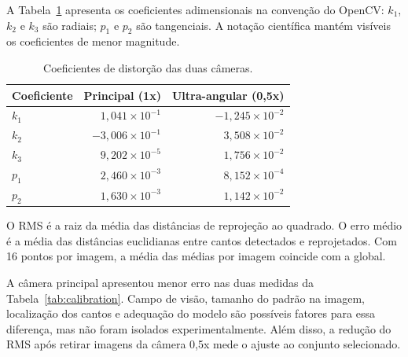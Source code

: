 A Tabela~\ref{tab:distortion} apresenta os coeficientes adimensionais na
convenção do OpenCV: $k_1$, $k_2$ e $k_3$ são radiais; $p_1$ e $p_2$ são
tangenciais. A notação científica mantém visíveis os coeficientes de menor
magnitude.
\begin{table}[H]
  \centering
  \caption{Coeficientes de distorção das duas câmeras.}
  \label{tab:distortion}
  \begin{tabular}{lrr}
    \toprule
    Coeficiente & Principal (1x) & Ultra-angular (0,5x)\\
    \midrule
    $k_1$ & $1{,}041\times10^{-1}$ & $-1{,}245\times10^{-2}$\\
    $k_2$ & $-3{,}006\times10^{-1}$ & $3{,}508\times10^{-2}$\\
    $k_3$ & $9{,}202\times10^{-5}$ & $1{,}756\times10^{-2}$\\
    $p_1$ & $2{,}460\times10^{-3}$ & $8{,}152\times10^{-4}$\\
    $p_2$ & $1{,}630\times10^{-3}$ & $1{,}142\times10^{-2}$\\
    \bottomrule
  \end{tabular}
\end{table}

O RMS é a raiz da média das distâncias de reprojeção ao quadrado. O erro médio
é a média das distâncias euclidianas entre cantos detectados e reprojetados.
Com 16 pontos por imagem, a média das médias por imagem coincide com a global.

A câmera principal apresentou menor erro nas duas medidas da
Tabela~\ref{tab:calibration}. Campo de visão, tamanho do padrão na imagem,
localização dos cantos e adequação do modelo são possíveis fatores para essa
diferença, mas não foram isolados experimentalmente. Além disso, a redução do
RMS após retirar imagens da câmera 0,5x mede o ajuste ao conjunto selecionado.
